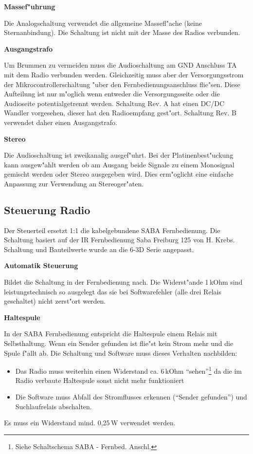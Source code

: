 \documentclass[ngerman,11pt,parskip=half] {scrartcl}
\begin{document}
\textbf{Massef"uhrung}

Die Analogschaltung verwendet die allgemeine Massefl"ache (keine Sternanbindung). Die Schaltung ist nicht mit der Masse des Radios verbunden.

\textbf{Ausgangstrafo}

Um Brummen zu vermeiden muss die Audioschaltung am GND Anschluss TA mit dem Radio verbunden werden. Gleichzeitig muss aber der Versorgungsstrom der Mikrocontrollerschaltung "uber den Fernbedienungsanschluss flie"sen. Diese Aufteilung ist nur m"oglich wenn entweder die Versorgungsseite oder die Audioseite potentialgetrennt werden. Schaltung Rev. A hat einen DC/DC Wandler vorgesehen, dieser hat den Radioempfang gest"ort. Schaltung Rev. B verwendet daher einen Ausgangstrafo.

\textbf{Stereo}

Die Audioschaltung ist zweikanalig ausgef"uhrt. Bei der Platinenbest"uckung kann ausgew"ahlt werden ob am Ausgang beide Signale zu einem Monosignal gemischt werden oder Stereo ausgegeben wird. Dies erm"oglicht eine einfache Anpassung zur Verwendung an Stereoger"aten.

\subsection{Steuerung Radio} \label{sec:schaltung:steuern-radio}

Der Steuerteil ersetzt 1:1 die kabelgebundene SABA Fernbedienung. Die Schaltung basiert auf der IR Fernbedienung Saba Freiburg 125 von H. Krebs. Schaltung und Bauteilwerte wurde an die 6-3D Serie angepasst.

\textbf{Automatik Steuerung}

Bildet die Schaltung in der Fernbedienung nach. Die Widerst"ande 1\,kOhm sind leistungstechnisch so ausgelegt das sie bei Softwarefehler (alle drei Relais geschaltet) nicht zerst"ort werden.

\textbf{Haltespule}

In der SABA Fernbedienung entspricht die Haltespule einem Relais mit Selbsthaltung. Wenn ein Sender gefunden ist flie"st kein Strom mehr und die Spule f"allt ab. Die Schaltung und Software muss dieses Verhalten nachbilden:
\begin{itemize}
\item Das Radio muss weiterhin einen Widerstand ca. 6\,kOhm "`sehen"'\footnote{Siehe Schaltschema SABA - Fernbed. Anschl.} da die im Radio verbaute Haltespule sonst nicht mehr funktioniert
\item Die Software muss Abfall des Stromflusses erkennen ("`Sender gefunden"') und Suchlaufrelais abschalten.
\end{itemize}
Es muss ein Widerstand mind. 0,25\,W verwendet werden.
\end{document}
